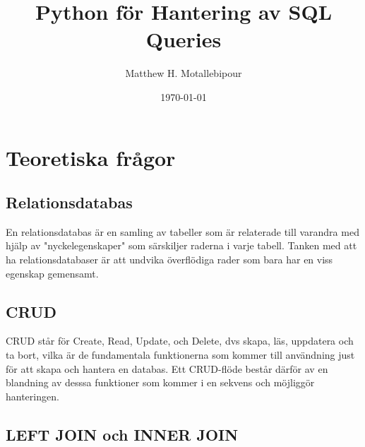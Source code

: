 \documentclass[]{article}
\begin{document}

\title{Python för Hantering av SQL Queries}
\author{Matthew H. Motallebipour}
\date{\today}
\maketitle

\section{Teoretiska frågor}


\subsection{Relationsdatabas}

En relationsdatabas är en samling av tabeller som är relaterade till varandra med hjälp av "nyckelegenskaper" som särskiljer raderna i varje tabell. Tanken med att ha relationsdatabaser är att undvika överflödiga rader som bara har en viss egenskap gemensamt.


\subsection{CRUD}

CRUD står för Create, Read, Update, och Delete, dvs skapa, läs, uppdatera och ta bort, vilka är de fundamentala funktionerna som kommer till användning just för att skapa och hantera en databas. Ett CRUD-flöde består därför av en blandning av desssa funktioner som kommer i en sekvens och möjliggör hanteringen.



\subsection{LEFT JOIN och INNER JOIN}
\end{document}
